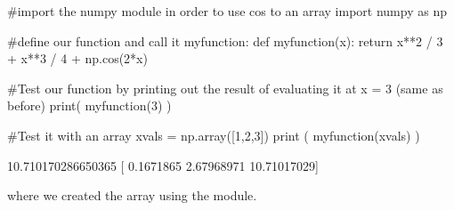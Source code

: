 \begin{python}[caption=Defining a function that works on an array] 
#import the numpy module in order to use cos to an array
import numpy as np

#define our function and call it myfunction:
def myfunction(x):
  return x**2 / 3 + x**3 / 4 + np.cos(2*x)
  
#Test our function by printing out the result of evaluating it at x = 3 (same as before)
print( myfunction(3) )  

#Test it with an array
xvals = np.array([1,2,3])
print ( myfunction(xvals) )  

\end{python}
\begin{poutput}
10.710170286650365
[ 0.1671865   2.67968971 10.71017029]
\end{poutput}
where we created the array  using the  module.

